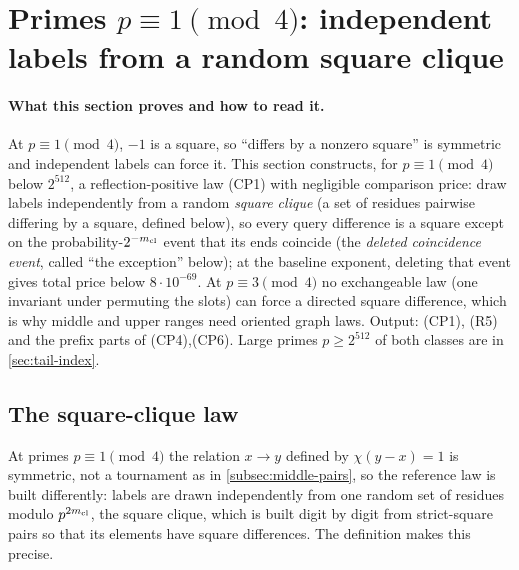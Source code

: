 \section{Primes \texorpdfstring{$p\equiv1\pmod4$}{p = 1 (mod 4)}: independent labels from a random square clique}
\label{sec:frontier:iidprefix}

\paragraph{What this section proves and how to read it.}
At $p\equiv1\pmod4$, $-1$ is a square, so ``differs by a nonzero
square'' is symmetric and independent labels can force it. This
section constructs, for $p\equiv1\pmod4$ below $2^{512}$, a
reflection-positive law (CP1) with negligible comparison price: draw
labels independently from a random \emph{square clique} (a set of
residues pairwise differing by a square, defined below), so every
query difference is a square except on the probability-$2^{-m_{\mathrm{cl}}}$
event that its ends coincide (the \emph{deleted coincidence event},
called ``the exception'' below); at the baseline exponent, deleting that
event gives total price below $8\cdot10^{-69}$. At $p\equiv3\pmod4$ no exchangeable law
(one invariant under permuting the slots) can force a directed square
difference, which is why middle and
upper ranges need oriented graph laws. Output: (CP1), (R5) and the
prefix parts of (CP4),(CP6). Large primes $p\ge2^{512}$ of both
classes are in \cref{sec:tail-index}.

\subsection{The square-clique law}\label{subsec:clique-law}

At primes $p\equiv1\pmod4$ the relation $x\to y$ defined by
$\chi(y-x)=1$ is symmetric, not a tournament as in
\cref{subsec:middle-pairs}, so the
reference law is built differently: labels are drawn independently
from one random set of residues modulo $p^{2m_{\mathrm{cl}}}$, the square
clique, which is built digit by digit from strict-square pairs so
that its elements have square differences. The definition makes
this precise.

